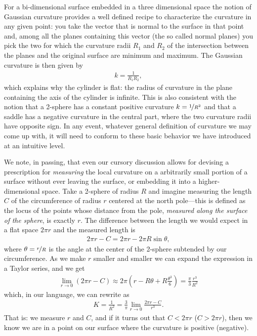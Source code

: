 For a bi-dimensional surface embedded in a three dimensional space the notion of
Gaussian curvature provides a well defined recipe to characterize the curvature
in any given point: you take the vector that is normal to the surface in that
point and, among all the planes containing this vector (the so called normal planes)
you pick the two for which the curvature radii $R_1$ and $R_2$ of the intersection
between the planes and the original surface are minimum and maximum. The Gaussian
curvature is then given by
\begin{align}\label{eq:gaussian_curvature}
  k = \frac{1}{R_1 R_2},
\end{align}
which explains why the cylinder is flat: the radius of curvature in the plane containing
the axis of the cylinder is infinite. This is also consistent with the notion that
a 2-sphere has a constant positive curvature $k = \nicefrac{1}{R^2}$ and that a
saddle has a negative curvature in the central part, where the two curvature radii
have opposite sign. In any event, whatever general definition of curvature we may
come up with, it will need to conform to these basic behavior we have introduced
at an intuitive level.

We note, in passing, that even our cursory discussion allows for devising a prescription
for \emph{measuring} the local curvature on a arbitrarily small portion of a surface
without ever leaving the surface, or embedding it into a higher-dimensional space.
Take a 2-sphere of radius $R$ and imagine measuring the length $C$ of the circumference
of radius $r$ centered at the north pole---this is defined as the locus of the points
whose distance from the pole, \emph{measured along the surface of the sphere}, is
exactly $r$. The difference between the length we would expect
in a flat space $2\pi r$ and the measured length is
\begin{align*}
  2\pi r - C = 2\pi r - 2\pi R \sin\theta,
\end{align*}
where $\theta = \nicefrac{r}{R}$ is the angle at the center of the 2-sphere subtended
by our circumference. As we make $r$ smaller and smaller we can expand the expression
in a Taylor series, and we get
\begin{align*}
  \lim_{r\rightarrow 0} (2\pi r - C) \approx
  2\pi \left( r - R\theta + R \frac{\theta^3}{6} \right) =
  \frac{\pi}{3} \frac{r^3}{R^2}
\end{align*}
which, in our language, we can rewrite as
\begin{align}
  K = \frac{1}{R^2} = \frac{3}{\pi} \lim_{r\rightarrow 0} \frac{2\pi r - C}{r^3}.
\end{align}
That is: we measure $r$ and $C$, and if it turns out that $C < 2\pi r$ ($C > 2\pi r$),
then we know we are in a point on our surface where the curvature is positive (negative).



